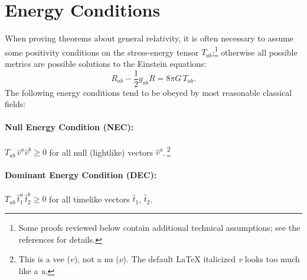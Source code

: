 \documentclass[12pt,a4paper]{article}
\def\be{\begin{equation}}
\def\ee{\end{equation}}
\begin{document}
\section{Energy Conditions} \label{sec:energy}

When proving theorems about general relativity, it is often necessary to assume some positivity conditions on the stress-energy tensor $T_{ab}$;\footnote{Some proofs reviewed below contain additional technical assumptions; see the references for details.} otherwise all possible metrics are possible solutions to the Einstein equations:
\be
R_{ab} - \frac{1}{2}g_{ab}R = 8\pi G\,T_{ab}.
\ee  
The following energy conditions tend to be obeyed by most reasonable classical fields: 

\paragraph{Null Energy Condition (NEC):} $T_{ab} \,\hat{v}^a \hat{v}^b \geq 0$ for all null (lightlike) vectors $\hat{v}^a$.\,\footnote{This is a vee ($v$), not a nu ($\nu$).  The default LaTeX italicized \textit{v} looks too much like a \textit{u}.}



\paragraph{Dominant Energy Condition (DEC):} $T_{ab} \,\hat{t}_1^a \,\hat{t}_2^b \geq 0$ for all timelike vectors $\hat{t}_1$, $\hat{t}_2$. \newline
\end{document}
